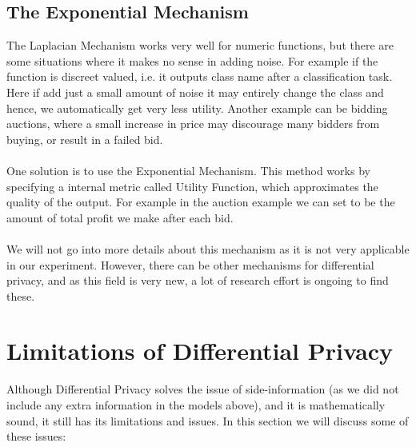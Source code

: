 \documentclass[12pt]{report}
\theoremstyle{named}
\begin{document}
\subsection{The Exponential Mechanism}
The Laplacian Mechanism works very well for numeric functions, but there are some situations where it makes no sense in adding noise. For example if the function is discreet valued, i.e. it outputs class name after a classification task. Here if add just a small amount of noise it may entirely change the class and hence, we automatically get very less utility. Another example can be bidding auctions, where a small increase in price may discourage many bidders from buying, or result in a failed bid.
\paragraph{}
One solution is to use the Exponential Mechanism\cite{mcsherry2007mechanism}. This method works by specifying a internal metric called Utility Function, which approximates the quality of the output. For example in the auction example we can set to be the amount of total profit we make after each bid.


\paragraph{}
We will not go into more details about this mechanism as it is not very applicable in our experiment. However, there can be other mechanisms for differential privacy, and as this field is very new, a lot of research effort is ongoing to find these.

\section{Limitations of Differential Privacy}
Although Differential Privacy solves the issue of side-information (as we did not include any extra information in the models above), and it is mathematically sound, it still has its limitations and issues. In this section we will discuss some of these issues:
\end{document}
